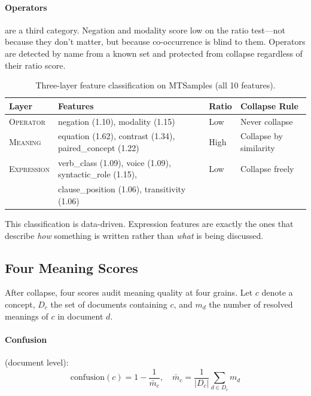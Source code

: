 \documentclass[11pt,a4paper]{article}
\begin{document}
\paragraph{Operators} are a third category. Negation and modality score low on the ratio test---not because they don't matter, but because co-occurrence is blind to them. Operators are detected by name from a known set and protected from collapse regardless of their ratio score.

\begin{table}[h]
\centering
\small
\begin{tabular}{llll}
\toprule
Layer & Features & Ratio & Collapse Rule \\
\midrule
\textsc{Operator} & negation (1.10), modality (1.15) & Low & Never collapse \\
\textsc{Meaning} & equation (1.62), contrast (1.34), paired\_concept (1.22) & High & Collapse by similarity \\
\textsc{Expression} & verb\_class (1.09), voice (1.09), syntactic\_role (1.15), & Low & Collapse freely \\
 & clause\_position (1.06), transitivity (1.06) & & \\
\bottomrule
\end{tabular}
\caption{Three-layer feature classification on MTSamples (all 10 features).}
\label{tab:layers}
\end{table}

This classification is data-driven. Expression features are exactly the ones that describe \emph{how} something is written rather than \emph{what} is being discussed.

\subsection{Four Meaning Scores}
\label{sec:scores}

After collapse, four scores audit meaning quality at four grains. Let $c$ denote a concept, $D_c$ the set of documents containing $c$, and $m_d$ the number of resolved meanings of $c$ in document $d$.

\paragraph{Confusion} (document level):
\begin{equation}
\text{confusion}(c) = 1 - \frac{1}{\bar{m}_c}, \quad \bar{m}_c = \frac{1}{|D_c|} \sum_{d \in D_c} m_d
\end{equation}
\end{document}
